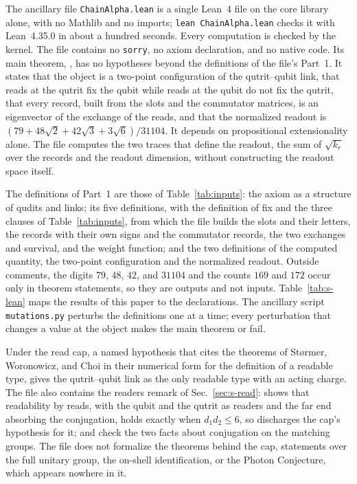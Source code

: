 The ancillary file \texttt{ChainAlpha.lean} is a single Lean~4 file on the core library alone, with no Mathlib and no imports; \texttt{lean ChainAlpha.lean} checks it with Lean~4.35.0 in about a hundred seconds. Every computation is checked by the kernel. The file contains no \texttt{sorry}, no axiom declaration, and no native code. Its main theorem, , has no hypotheses beyond the definitions of the file's Part~1. It states that the object is a two-point configuration of the qutrit--qubit link, that reads at the qutrit fix the qubit while reads at the qubit do not fix the qutrit, that every record, built from the slots and the commutator matrices, is an eigenvector of the exchange of the reads, and that the normalized readout is $(79+48\sqrt{2}+42\sqrt{3}+3\sqrt{6})/31104$. It depends on propositional extensionality alone. The file computes the two traces that define the readout, the sum of $\sqrt{k_{r}}$ over the records and the readout dimension, without constructing the readout space itself.

The definitions of Part~1 are those of Table~\ref{tab:inputs}: the axiom as a structure of qudits and links; its five definitions, with the definition of fix and the three clauses of Table~\ref{tab:inputs}, from which the file builds the slots and their letters, the records with their own signs and the commutator records, the two exchanges and survival, and the weight function; and the two definitions of the computed quantity, the two-point configuration and the normalized readout.
Outside comments, the digits $79$, $48$, $42$, and $31104$ and the counts $169$ and $172$ occur only in theorem statements, so they are outputs and not inputs. Table~\ref{tab:s-lean} maps the results of this paper to the declarations. The ancillary script \texttt{mutations.py} perturbs the definitions one at a time; every perturbation that changes a value at the object makes the main theorem or  fail.

Under the read cap, a named hypothesis that cites the theorems of St{\o}rmer, Woronowicz, and Choi in their numerical form for the definition of a readable type,  gives the qutrit--qubit link as the only readable type with an acting charge. The file also contains the readers remark of Sec.~\ref{sec:s-read}:  shows that readability by reads, with the qubit and the qutrit as readers and the far end absorbing the conjugation, holds exactly when $d_{1}d_{2}\leq 6$, so  discharges the cap's hypothesis for it;  and  check the two facts about conjugation on the matching groups. The file does not formalize the theorems behind the cap, statements over the full unitary group, the on-shell identification, or the Photon Conjecture, which appears nowhere in it.



